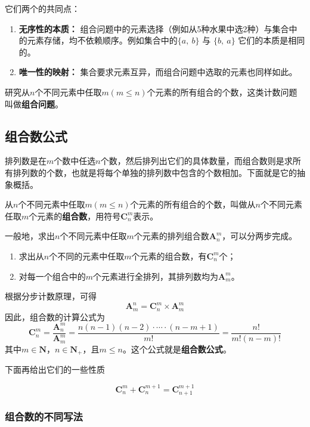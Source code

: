 它们两个的共同点：
\begin{enumerate}
    \item \textbf{无序性的本质：} 组合问题中的元素选择（例如从5种水果中选2种）与集合中的元素存储，均不依赖顺序。例如集合中的$\{ a,~b\}$ 与 $\{ b,~a\}$ 它们的本质是相同的。
    \item \textbf{唯一性的映射：} 集合要求元素互异，而组合问题中选取的元素也同样如此。
\end{enumerate}
研究从$n$个不同元素中任取$m(m \le n)$个元素的所有组合的个数，这类计数问题叫做\textbf{组合问题}。

\subsection{组合数公式}

排列数是在$m$个数中任选$n$个数，然后排列出它们的具体数量，而组合数则是求所有排列数的个数，也就是将每个单独的排列数中包含的个数相加。下面就是它的抽象概括。

从$n$个不同元素中任取$m(m \le n)$个元素的所有组合的个数，叫做从$n$个不同元素任取$m$个元素的\textbf{组合数}，用符号$\textbf{C}_{n}^{m}$表示。

一般地，求出$n$个不同元素中任取$m$个元素的排列组合数$\textbf{A}_{n}^m$，可以分两步完成。
\begin{enumerate}
    \item 求出从$n$个不同的元素中任取$m$个元素的组合数，有$\textbf{C}_n^{m}$个；
    \item 对每一个组合中的$m$个元素进行全排列，其排列数均为$\textbf{A}_{m}^{m}$。
\end{enumerate}
根据分步计数原理，可得
\begin{equation}
    \textbf{A}_{m}^{n} = \textbf{C}_{n}^{m} \times \textbf{A}_{m}^{m}
\end{equation}
因此，组合数的计算公式为
\begin{equation}
    \textbf{C}_{n}^{m}=\frac{\textbf{A}_{n}^{m}}{\textbf{A}_{m}^{m}}=\frac{n(n-1)(n-2)\cdot{}\cdots{}\cdot{}(n-m+1)}{m!}=\frac{n!}{m!(n-m)!}
\end{equation}
其中$m \in \mathbf{N}$，$n \in \mathbf{N}_{+}$，且$m \le n$。这个公式就是\textbf{组合数公式}。

下面再给出它们的一些性质

\begin{equation}
    \textbf{C}_{n}^{m} + \textbf{C}_{n}^{m+1} = \textbf{C}_{n+1}^{m+1}
\end{equation}

\subsubsection{组合数的不同写法}

